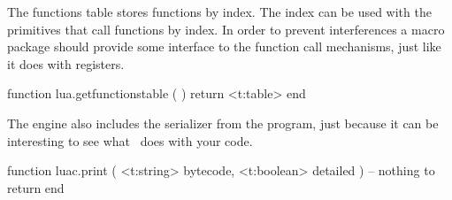 \stopsubsection

\startsubsection[title=Functions]

The functions table stores functions by index. The index can be used with the
primitives that call functions by index. In order to prevent interferences a
macro package should provide some interface to the function call mechanisms, just
like it does with registers.

\starttyping[option=LUA]
function lua.getfunctionstable ( )
    return <t:table>
end
\stoptyping

\stopsubsection

\startsubsection[title=Tracing]

The engine also includes the serializer from the  program, just
because it can be interesting to see what \LUA\ does with your code.

\starttyping[option=LUA]
function luac.print ( <t:string> bytecode, <t:boolean> detailed )
    -- nothing to return
end
\stoptyping

\stopsubsection

%
%
%
%
%
%
%

\stopsection

\stopdocument

